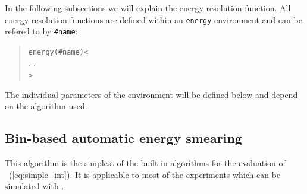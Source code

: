 In the following subsections we will explain the energy resolution function.
All energy resolution functions are defined within an {\tt energy} environment and can be refered to by {\tt \#name}:
\begin{quote}
  {\tt energy(\#name)<\\
\tb $\ldots$\\
>}
\end{quote}
The individual parameters of the environment will be defined below and depend on the algorithm used.

\subsection{Bin-based automatic energy smearing}

This algorithm is the simplest of the built-in algorithms for the evaluation
of \eq~(\ref{eq:simple_int}). It is applicable to most of the
experiments which can be simulated with \GLOBES .

